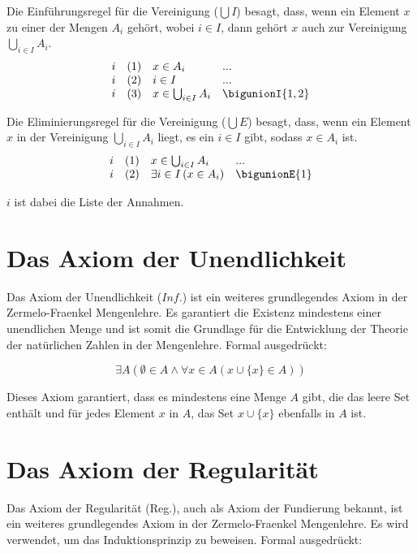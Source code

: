 \documentclass{book}
\theoremstyle{plain}
\theoremstyle{remark}
\theoremstyle{definition}
\begin{document}
Die Einführungsregel für die Vereinigung (\(\bigcup I\)) besagt, dass, wenn ein Element \( x \) zu einer der Mengen \( A_i \) gehört, wobei \( i \in I \), dann gehört \( x \) auch zur Vereinigung \(\bigcup_{i \in I} A_i\).
\[
\begin{array}{llll}
    i & (1) & x \in A_i & ... \\
    i & (2) & i \in I & ... \\
    i & (3) & x \in \bigcup_{i \in I} A_i & \bigunionI{1,2} \\
\end{array}
\]

Die Eliminierungsregel für die Vereinigung (\(\bigcup E\)) besagt, dass, wenn ein Element \( x \) in der Vereinigung \(\bigcup_{i \in I} A_i\) liegt, es ein \( i \in I \) gibt, sodass \( x \in A_i \) ist.
\[
\begin{array}{llll}
    i & (1) & x \in \bigcup_{i \in I} A_i & ... \\
    i & (2) & \exists i \in I \, (x \in A_i) & \bigunionE{1} \\
\end{array}
\]

\(i\) ist dabei die Liste der Annahmen.

\section{Das Axiom der Unendlichkeit}

Das Axiom der Unendlichkeit (\(Inf.\)) ist ein weiteres grundlegendes Axiom in der Zermelo-Fraenkel Mengenlehre. Es garantiert die Existenz mindestens einer unendlichen Menge und ist somit die Grundlage für die Entwicklung der Theorie der natürlichen Zahlen in der Mengenlehre. Formal ausgedrückt:

\label{ExALpEmptysetInAAndFaxInALpxcuLbxRbInARpRp}
\[
\exists A (\emptyset \in A \land \forall x\in A (x \cup \{x\} \in A))
\]

Dieses Axiom garantiert, dass es mindestens eine Menge \( A \) gibt, die das leere Set enthält und für jedes Element \( x \) in \( A \), das Set \( x \cup \{x\} \) ebenfalls in \( A \) ist.

\section{Das Axiom der Regularität}
\label{rule:Regularity}
Das Axiom der Regularität (Reg.), auch als Axiom der Fundierung bekannt, ist ein weiteres grundlegendes Axiom in der Zermelo-Fraenkel Mengenlehre. Es wird verwendet, um das Induktionsprinzip zu beweisen. Formal ausgedrückt:
\end{document}

